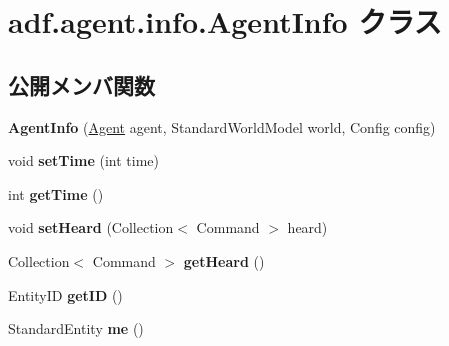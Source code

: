 \hypertarget{classadf_1_1agent_1_1info_1_1AgentInfo}{}\section{adf.\+agent.\+info.\+Agent\+Info クラス}
\label{classadf_1_1agent_1_1info_1_1AgentInfo}
\subsection*{公開メンバ関数}
\begin{DoxyCompactItemize}
\item 
\hypertarget{classadf_1_1agent_1_1info_1_1AgentInfo_ac47ac11456ed03e8b98e1bfdb064dd18}{}\label{classadf_1_1agent_1_1info_1_1AgentInfo_ac47ac11456ed03e8b98e1bfdb064dd18} 
{\bfseries Agent\+Info} (\hyperlink{classadf_1_1agent_1_1Agent}{Agent} agent, Standard\+World\+Model world, Config config)
\item 
\hypertarget{classadf_1_1agent_1_1info_1_1AgentInfo_ad71982be9431abce3530ef4622852b34}{}\label{classadf_1_1agent_1_1info_1_1AgentInfo_ad71982be9431abce3530ef4622852b34} 
void {\bfseries set\+Time} (int time)
\item 
\hypertarget{classadf_1_1agent_1_1info_1_1AgentInfo_a2d1b58a841fd0092b5810b98a61bb9bb}{}\label{classadf_1_1agent_1_1info_1_1AgentInfo_a2d1b58a841fd0092b5810b98a61bb9bb} 
int {\bfseries get\+Time} ()
\item 
\hypertarget{classadf_1_1agent_1_1info_1_1AgentInfo_a23b8ecd1a583015ab5b6734ef513368f}{}\label{classadf_1_1agent_1_1info_1_1AgentInfo_a23b8ecd1a583015ab5b6734ef513368f} 
void {\bfseries set\+Heard} (Collection$<$ Command $>$ heard)
\item 
\hypertarget{classadf_1_1agent_1_1info_1_1AgentInfo_aa1a2550f424cc19a8b4d01531f2c797a}{}\label{classadf_1_1agent_1_1info_1_1AgentInfo_aa1a2550f424cc19a8b4d01531f2c797a} 
Collection$<$ Command $>$ {\bfseries get\+Heard} ()
\item 
\hypertarget{classadf_1_1agent_1_1info_1_1AgentInfo_a378db4a943ea7e16821b4950a59dfacf}{}\label{classadf_1_1agent_1_1info_1_1AgentInfo_a378db4a943ea7e16821b4950a59dfacf} 
Entity\+ID {\bfseries get\+ID} ()
\item 
\hypertarget{classadf_1_1agent_1_1info_1_1AgentInfo_a091c4fe745d95da7b3415c8f20626230}{}\label{classadf_1_1agent_1_1info_1_1AgentInfo_a091c4fe745d95da7b3415c8f20626230} 
Standard\+Entity {\bfseries me} ()
\item 
\hypertarget{classadf_1_1agent_1_1info_1_1AgentInfo_a4ed5eba8b822332d06d151dadd5ba953}{}\label{classadf_1_1agent_1_1info_1_1AgentInfo_a4ed5eba8b822332d06d151dadd5ba953} 

\end{DoxyCompactItemize}
